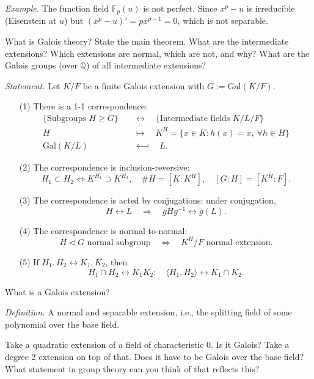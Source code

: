 \documentclass{mathproblems}
\newcommand\F{\mathbb{F}}
\newcommand\Q{\mathbb{Q}}
\newcommand\Gal{\mathrm{Gal}}
\begin{document}
\begin{questions}
\textit{Example.}
The function field $\F_p(u)$ is not perfect. Since $x^p-u$ is irreducible (Eisenstein at $u$) but $(x^p-u)'=p x^{p-1}=0$, which is not separable.

\miquestion
{\color{blue} What is Galois theory? State the main theorem. What are the intermediate extensions? Which extensions are normal, which are not, and why? What are the Galois groups (over $\Q$) of all intermediate extensions?}

{\color{violet}
\textit{Statement.} Let $K/F$ be a finite Galois extension with $G:=\Gal(K/F)$.
\begin{itemize}
\item[(1)] There is a 1-1 correspondence:
$$
\begin{aligned}
\{\text{Subgroups } H\geq G\} & \quad \longleftrightarrow \quad \{\text{Intermediate fields } K/L/F\} \\
H & \quad\longmapsto\quad K^H=\{x\in K: h(x)=x, \ \forall h\in H\}\\
\Gal(K/L) & \quad\longmapsfrom\quad L.
\end{aligned}
$$
\item[(2)] The correspondence is inclusion-reversive: $$
H_1\subset H_2 \Longleftrightarrow K^{H_1}\supset K^{H_2},\quad \# H=[K:K^H], \quad [G:H]=[K^H:F].
$$
\item[(3)] The correspondence is acted by conjugations: under conjugation,
$$
H \longleftrightarrow L \quad \Longrightarrow \quad g H g^{-1}\longleftrightarrow g(L).
$$
\item[(4)] The correspondence is normal-to-normal:
$$
H \triangleleft G \text{ normal subgroup} \quad \Longleftrightarrow \quad K^H/F \text{ normal extension}.
$$
\item[(5)] If $H_1,H_2\leftrightarrow K_1,K_2$, then
$$
H_1\cap H_2 \longleftrightarrow K_1K_2; \quad \langle H_1, H_2 \rangle \longleftrightarrow K_1\cap K_2.
$$

\end{itemize}
}

\miquestion
{\color{blue} What is a Galois extension?}

\textit{Definition.} A normal and separable extension, i.e., the splitting field of some polynomial over the base field.

\miquestion
{\color{blue} Take a quadratic extension of a field of characteristic 0. Is it Galois? Take a degree 2 extension on top of that. Does it have to be Galois over the base field? What statement in group theory can you think of that reflects this?}


\end{questions}
\end{document}
